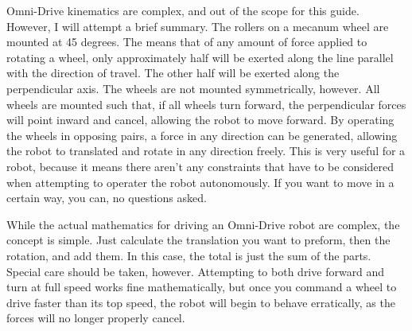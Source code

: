 Omni-Drive kinematics are complex, and out of the scope for this guide. However, I will attempt a brief summary. The rollers on a mecanum wheel are mounted at 45 degrees. The means that of any amount of force applied to rotating a wheel, only approximately half will be exerted along the line parallel with the direction of travel. The other half will be exerted along the perpendicular axis. The wheels are not mounted symmetrically, however. All wheels are mounted such that, if all wheels turn forward, the perpendicular forces will point inward and cancel, allowing the robot to move forward. By operating the wheels in opposing pairs, a force in any direction can be generated, allowing the robot to translated and rotate in any direction freely. This is very useful for a robot, because it means there aren't any constraints that have to be considered when attempting to operater the robot autonomously. If you want to move in a certain way, you can, no questions asked.

While the actual mathematics for driving an Omni-Drive robot are complex, the concept is simple. Just calculate the translation you want to preform, then the rotation, and add them. In this case, the total is just the sum of the parts. Special care should be taken, however. Attempting to both drive forward and turn at full speed works fine mathematically, but once you command a wheel to drive faster than its top speed, the robot will begin to behave erratically, as the forces will no longer properly cancel.



























